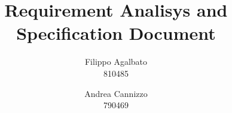 \documentclass[a4paper]{report}
\begin{document}
\title{\Huge Requirement Analisys and Specification Document}
\author{Filippo Agalbato \\ 810485 \and Andrea Cannizzo \\ 790469}
\maketitle

\tableofcontents




\end{document}
